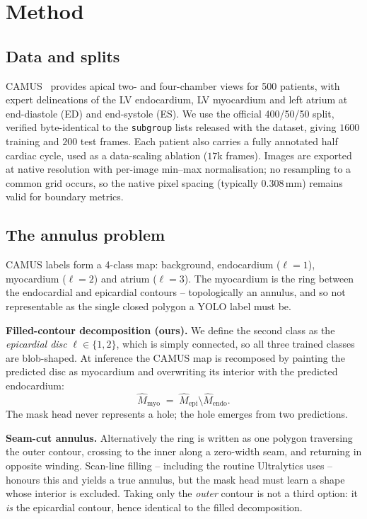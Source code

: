 \section{Method}
\label{sec:method}

\subsection{Data and splits}

CAMUS~\cite{leclerc2019camus} provides apical two- and four-chamber views for
500 patients, with expert delineations of the LV endocardium, LV myocardium and
left atrium at end-diastole (ED) and end-systole (ES). We use the official
400/50/50 split, verified byte-identical to the \texttt{subgroup} lists released
with the dataset, giving $1600$ training and $200$ test frames. Each patient also
carries a fully annotated half cardiac cycle, used as a data-scaling ablation
($17$k frames). Images are exported at native resolution with per-image
min--max normalisation; no resampling to a common grid occurs, so the native
pixel spacing (typically $0.308$\,mm) remains valid for boundary metrics.

\subsection{The annulus problem}
\label{sec:encoding}

CAMUS labels form a 4-class map: background, endocardium ($\ell{=}1$),
myocardium ($\ell{=}2$) and atrium ($\ell{=}3$). The myocardium is the ring
between the endocardial and epicardial contours -- topologically an annulus, and
so not representable as the single closed polygon a YOLO label must be.

\textbf{Filled-contour decomposition (ours).} We define the second class as the
\emph{epicardial disc} $\ell\in\{1,2\}$, which is simply connected, so all three
trained classes are blob-shaped. At inference the CAMUS map is recomposed by
painting the predicted disc as myocardium and overwriting its interior with the
predicted endocardium:
\begin{equation}
\hat{M}_{\text{myo}} \;=\; \hat{M}_{\text{epi}} \setminus \hat{M}_{\text{endo}} .
\label{eq:decomp}
\end{equation}
The mask head never represents a hole; the hole emerges from two predictions.

\textbf{Seam-cut annulus.} Alternatively the ring is written as one polygon
traversing the outer contour, crossing to the inner along a zero-width seam, and
returning in opposite winding. Scan-line filling -- including the routine
Ultralytics uses -- honours this and yields a true annulus, but the mask head
must learn a shape whose interior is excluded. Taking only the \emph{outer}
contour is not a third option: it \emph{is} the epicardial contour, hence
identical to the filled decomposition.

